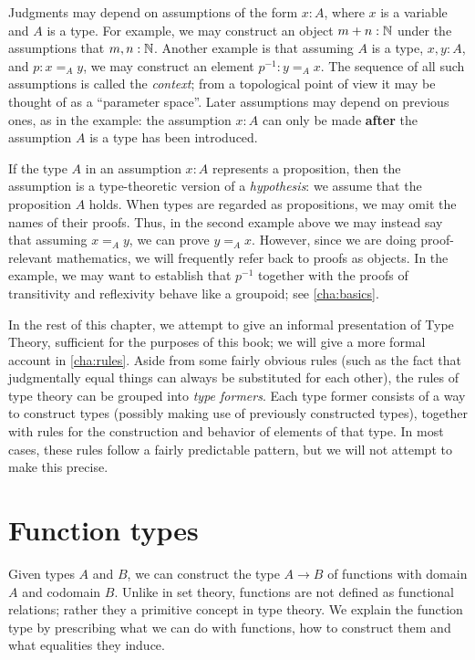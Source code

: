 Judgments may depend on assumptions of the form $x:A$, where $x$ is a variable and $A$ is a type.
For example, we may construct an object $m + n : \mathbb{N}$ under the assumptions that $m,n : \mathbb{N}$.
Another example is that assuming $A$ is a type, $x,y : A$, and $p : x =_A y$, we may construct an element $p^{-1} : y =_A x$.
The sequence of all such assumptions is called the \emph{context}; from a topological point of view it may be thought of as a ``parameter space''.
Later assumptions may depend on previous ones, as in the example: the assumption $x:A$ can only be made \textbf{after} the assumption $A$ is a type has been introduced.

If the type $A$ in an assumption $x:A$ represents a proposition, then the assumption is a type-theoretic version of a \emph{hypothesis}: we assume that the proposition $A$ holds.
When types are regarded as propositions, we may omit the names of their proofs.
Thus, in the second example above we may instead say that assuming $x =_A y$, we can prove $y =_A x$.
However, since we are doing proof-relevant mathematics, we will frequently refer back to proofs as objects.
In the example, we may want to establish that $p^{-1}$ together with the proofs of transitivity and reflexivity behave like a groupoid; see \autoref{cha:basics}.

In the rest of this chapter, we attempt to give an informal presentation of Type Theory, sufficient for the purposes of this book; we will give a more formal account in \autoref{cha:rules}.
Aside from some fairly obvious rules (such as the fact that judgmentally equal things can always be substituted for each other), the rules of type theory can be grouped into \emph{type formers}.
Each type former consists of a way to construct types (possibly making use of previously constructed types), together with rules for the construction and behavior of elements of that type.
In most cases, these rules follow a fairly predictable pattern, but we will not attempt to make this precise.


\section{Function types}
\label{sec:function-types}

Given types $A$ and $B$, we can construct the type $A \to B$ of functions with domain $A$
and codomain $B$. Unlike in set theory, functions are not defined as
functional relations; rather they a primitive concept in type theory.
We explain the function type by prescribing what we can do with functions, 
how to construct them and what equalities they induce.

